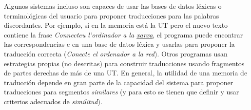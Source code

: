 Algunos sistemas incluso son capaces de usar las bases de datos
léxicas o terminológicas del usuario para proponer traducciones para
las palabras discordantes. Por ejemplo, si en la memoria está la UT
 pero el nuevo texto contiene la frase
  \emph{Connecteu l'ordinador a la \underline{xarxa}}, el programa
  puede encontrar las correspondencias 
  e  en una base de datos
  léxica y usarlas para proponer la traducción correcta (\emph{Conecte
    el ordenador a la red}). Otros programas usan estrategias propias
  (no descritas) para construir traducciones usando fragmentos de
  partes derechas de más de una UT. En general, la utilidad de una
  memoria de traducción depende en gran parte de la capacidad del
  sistema para proponer traducciones para segmentos \emph{similares}
  (y para esto se tienen que definir y usar criterios adecuados de
  \emph{similitud}).

